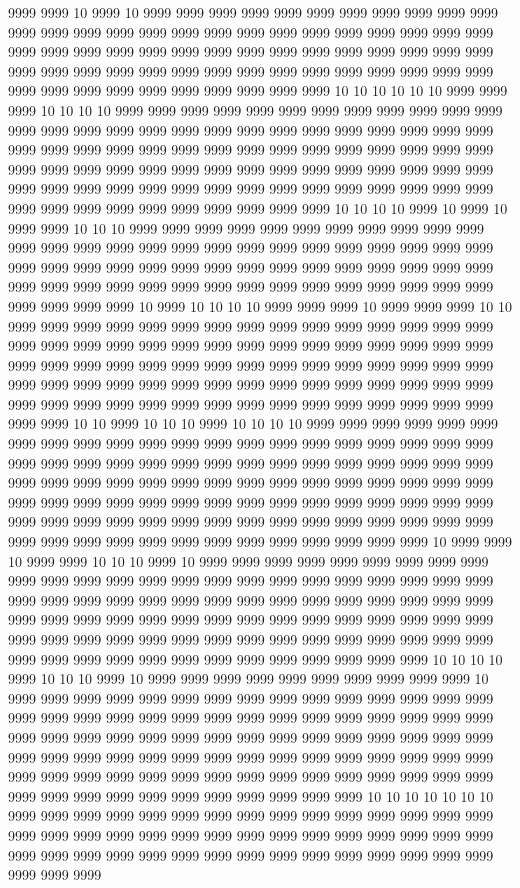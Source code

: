 9999 9999 10 9999 10 9999 9999 9999 9999 9999 9999 9999 9999 9999 9999 9999 9999 9999 9999 9999 9999 9999 9999 9999 9999 9999 9999 9999 9999 9999 9999 9999 9999 9999 9999 9999 9999 9999 9999 9999 9999 9999 9999 9999 9999 9999 9999 9999 9999 9999 9999 9999 9999 9999 9999 9999 9999 9999 9999 9999 9999 9999 9999 9999 9999 9999 9999 9999 9999 9999 9999 10 10 10 10 10 10 9999 9999 9999 10 10 10 10 9999 9999 9999 9999 9999 9999 9999 9999 9999 9999 9999 9999 9999 9999 9999 9999 9999 9999 9999 9999 9999 9999 9999 9999 9999 9999 9999 9999 9999 9999 9999 9999 9999 9999 9999 9999 9999 9999 9999 9999 9999 9999 9999 9999 9999 9999 9999 9999 9999 9999 9999 9999 9999 9999 9999 9999 9999 9999 9999 9999 9999 9999 9999 9999 9999 9999 9999 9999 9999 9999 9999 9999 9999 9999 9999 9999 9999 9999 9999 9999 9999 9999 10 10 10 10 9999 10 9999 10 9999 9999 10 10 10 9999 9999 9999 9999 9999 9999 9999 9999 9999 9999 9999 9999 9999 9999 9999 9999 9999 9999 9999 9999 9999 9999 9999 9999 9999 9999 9999 9999 9999 9999 9999 9999 9999 9999 9999 9999 9999 9999 9999 9999 9999 9999 9999 9999 9999 9999 9999 9999 9999 9999 9999 9999 9999 9999 9999 9999 9999 9999 9999 9999 10 9999 10 10 10 10 9999 9999 9999 10 9999 9999 9999 10 10 9999 9999 9999 9999 9999 9999 9999 9999 9999 9999 9999 9999 9999 9999 9999 9999 9999 9999 9999 9999 9999 9999 9999 9999 9999 9999 9999 9999 9999 9999 9999 9999 9999 9999 9999 9999 9999 9999 9999 9999 9999 9999 9999 9999 9999 9999 9999 9999 9999 9999 9999 9999 9999 9999 9999 9999 9999 9999 9999 9999 9999 9999 9999 9999 9999 9999 9999 9999 9999 9999 9999 9999 9999 9999 9999 9999 9999 10 10 9999 10 10 10 9999 10 10 10 10 9999 9999 9999 9999 9999 9999 9999 9999 9999 9999 9999 9999 9999 9999 9999 9999 9999 9999 9999 9999 9999 9999 9999 9999 9999 9999 9999 9999 9999 9999 9999 9999 9999 9999 9999 9999 9999 9999 9999 9999 9999 9999 9999 9999 9999 9999 9999 9999 9999 9999 9999 9999 9999 9999 9999 9999 9999 9999 9999 9999 9999 9999 9999 9999 9999 9999 9999 9999 9999 9999 9999 9999 9999 9999 9999 9999 9999 9999 9999 9999 9999 9999 9999 9999 9999 9999 9999 9999 9999 9999 9999 9999 9999 9999 10 9999 9999 10 9999 9999 10 10 10 9999 10 9999 9999 9999 9999 9999 9999 9999 9999 9999 9999 9999 9999 9999 9999 9999 9999 9999 9999 9999 9999 9999 9999 9999 9999 9999 9999 9999 9999 9999 9999 9999 9999 9999 9999 9999 9999 9999 9999 9999 9999 9999 9999 9999 9999 9999 9999 9999 9999 9999 9999 9999 9999 9999 9999 9999 9999 9999 9999 9999 9999 9999 9999 9999 9999 9999 9999 9999 9999 9999 9999 9999 9999 9999 9999 9999 9999 9999 9999 9999 9999 9999 9999 10 10 10 10 9999 10 10 10 9999 10 9999 9999 9999 9999 9999 9999 9999 9999 9999 9999 10 9999 9999 9999 9999 9999 9999 9999 9999 9999 9999 9999 9999 9999 9999 9999 9999 9999 9999 9999 9999 9999 9999 9999 9999 9999 9999 9999 9999 9999 9999 9999 9999 9999 9999 9999 9999 9999 9999 9999 9999 9999 9999 9999 9999 9999 9999 9999 9999 9999 9999 9999 9999 9999 9999 9999 9999 9999 9999 9999 9999 9999 9999 9999 9999 9999 9999 9999 9999 9999 9999 9999 9999 9999 9999 9999 9999 9999 9999 9999 9999 9999 9999 9999 9999 9999 9999 10 10 10 10 10 10 10 9999 9999 9999 9999 9999 9999 9999 9999 9999 9999 9999 9999 9999 9999 9999 9999 9999 9999 9999 9999 9999 9999 9999 9999 9999 9999 9999 9999 9999 9999 9999 9999 9999 9999 9999 9999 9999 9999 9999 9999 9999 9999 9999 9999 9999 9999 9999 9999 
